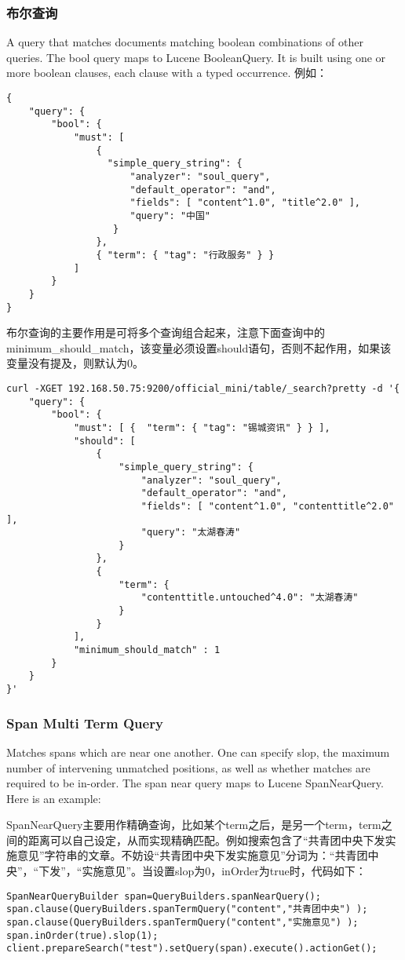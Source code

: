 \subsubsection{布尔查询}
A query that matches documents matching boolean combinations of other queries. The bool query maps to Lucene BooleanQuery. It is built using one or more boolean clauses, each clause with a typed occurrence. 例如：
\begin{verbatim}
{
    "query": {
        "bool": {
            "must": [
                {
                  "simple_query_string": {
                      "analyzer": "soul_query", 
                      "default_operator": "and", 
                      "fields": [ "content^1.0", "title^2.0" ], 
                      "query": "中国"
                   }
                }, 
                { "term": { "tag": "行政服务" } }
            ]
        }
    } 
}
\end{verbatim}
\par 布尔查询的主要作用是可将多个查询组合起来，注意下面查询中的minimum\_should\_match，该变量必须设置should语句，否则不起作用，如果该变量没有提及，则默认为0。
\begin{verbatim}
curl -XGET 192.168.50.75:9200/official_mini/table/_search?pretty -d '{
    "query": {
        "bool": {
            "must": [ {  "term": { "tag": "锡城资讯" } } ], 
            "should": [
                {
                    "simple_query_string": {
                        "analyzer": "soul_query", 
                        "default_operator": "and", 
                        "fields": [ "content^1.0", "contenttitle^2.0" ], 
                        "query": "太湖春涛"
                    }
                }, 
                {
                    "term": {
                        "contenttitle.untouched^4.0": "太湖春涛"
                    }
                }
            ], 
            "minimum_should_match" : 1
        }
    } 
}'
\end{verbatim}
\subsubsection{Span Multi Term Query}
Matches spans which are near one another. One can specify slop, the maximum number of intervening unmatched positions, as well as whether matches are required to be in-order. The span near query maps to Lucene SpanNearQuery. Here is an example:
\par SpanNearQuery主要用作精确查询，比如某个term之后，是另一个term，term之间的距离可以自己设定，从而实现精确匹配。例如搜索包含了“共青团中央下发实施意见”字符串的文章。不妨设“共青团中央下发实施意见”分词为：“共青团中央”，“下发”，“实施意见”。当设置slop为0，inOrder为true时，代码如下：
\begin{verbatim}
SpanNearQueryBuilder span=QueryBuilders.spanNearQuery();
span.clause(QueryBuilders.spanTermQuery("content","共青团中央") );
span.clause(QueryBuilders.spanTermQuery("content","实施意见") );
span.inOrder(true).slop(1);
client.prepareSearch("test").setQuery(span).execute().actionGet();
\end{verbatim}
